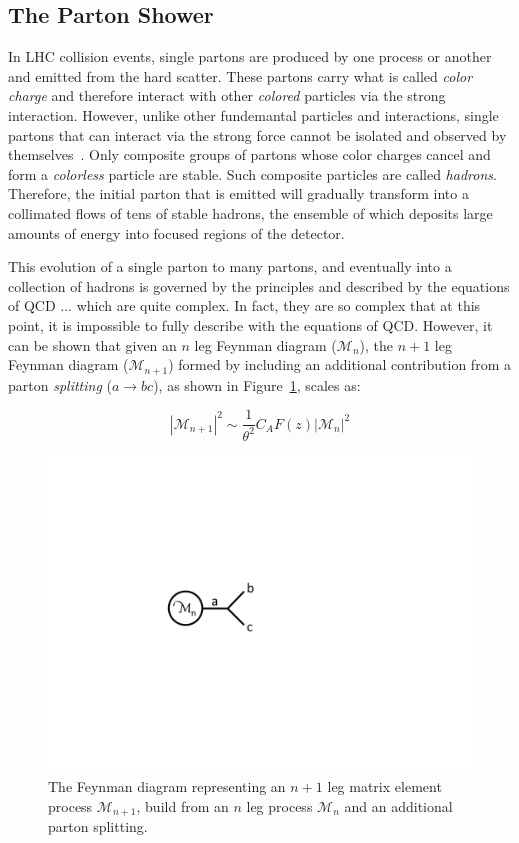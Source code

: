 \documentclass[UKenglish,texlive=2016]{\ATLASLATEXPATH atlasdoc}
\begin{document}
\subsection{The Parton Shower}
\label{sec:ps}
In LHC collision events, single partons are produced by one process or another and emitted from the hard scatter.  These partons carry what is called \textit{color charge} and therefore interact with other \textit{colored} particles via the strong interaction.  However, unlike other fundemantal particles and interactions, single partons that can interact via the strong force cannot be isolated and observed by themselves~\cite{wilcek:nobel}.  Only composite groups of partons whose color charges cancel and form a \textit{colorless} particle are stable.  Such composite particles are called \textit{hadrons}.  Therefore, the initial parton that is emitted will gradually transform into a collimated flows of tens of stable hadrons, the ensemble of which deposits large amounts of energy into focused regions of the detector.

This evolution of a single parton to many partons, and eventually into a collection of hadrons is governed by the principles and described by the equations of QCD ... which are quite complex.  In fact, they are so complex that at this point, it is impossible to fully describe with the equations of QCD.  However, it can be shown that given an $n$ leg Feynman diagram ($\mathcal{M}_{n}$), the $n+1$ leg Feynman diagram ($\mathcal{M}_{n+1}$) formed by including an additional contribution from a parton \textit{splitting} ($a\rightarrow bc$), as shown in Figure~\ref{fig:diagrams}, scales as:

\begin{equation}
|\mathcal{M}_{n+1}|^2 \sim \frac{1}{\theta^{2}} C_{A} F(z) |\mathcal{M}_{n}|^2
\end{equation}

\begin{figure}[!ht]
 \centering
 \includegraphics[width=0.3\columnwidth]{figures/diagram}
 \caption{The Feynman diagram representing an $n+1$ leg matrix element process $\mathcal{M}_{n+1}$, build from an $n$ leg process $\mathcal{M}_{n}$ and an additional parton splitting.
 \label{fig:diagrams}}
\end{figure}
\end{document}
